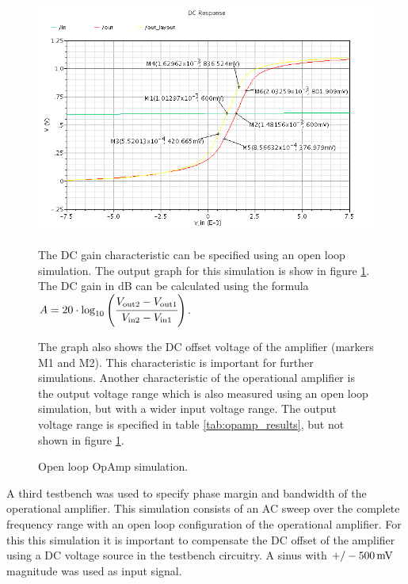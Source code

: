 \documentclass[parskip,oneside,colorbacktitle,10pt,accentcolor=tud1b,table]{tudreport}
\begin{document}
{\begin{figure}[H]
	\begin{minipage}[t]{0.55\textwidth} 
		\begin{center}
		    \includegraphics[scale=0.4]{opamp_openloop_detail}
		    \caption{Open loop OpAmp simulation.}
		    \label{fig:opamp_openloop_detail}	
		\end{center}
	\end{minipage}
	\begin{minipage}[t]{0.4\textwidth} 
	\setlength{\parskip}{\currentparskip} %
	\vspace{.8cm}
The DC gain characteristic can be specified using an open loop simulation. The output graph for this simulation is show in figure \ref{fig:opamp_openloop_detail}. 
The DC gain in dB can be calculated using the formula $A = 20 \cdot \log_{10} \left( \cfrac{V_\text{out2}-V_\text{out1}}{V_\text{in2}-V_\text{in1}} \right)$. 

The graph also shows the DC offset voltage of the amplifier (markers M1 and M2). This characteristic is important for further simulations.
 Another characteristic of the operational amplifier is the output voltage range which is also measured using an open loop simulation, but with a wider input voltage range. The output voltage range is specified in table \ref{tab:opamp_results}, but not shown in figure \ref{fig:opamp_openloop_detail}.
	\end{minipage}
\end{figure}

A third testbench was used to specify phase margin and bandwidth of the operational amplifier. This simulation consists of an AC sweep over the complete frequency range with an open loop configuration of the operational amplifier. For this this simulation it is important to compensate the DC offset of the amplifier using a DC voltage source in the testbench circuitry. A sinus with $\unit[+/-500]{mV}$ magnitude was used as input signal.

}
\end{document}

